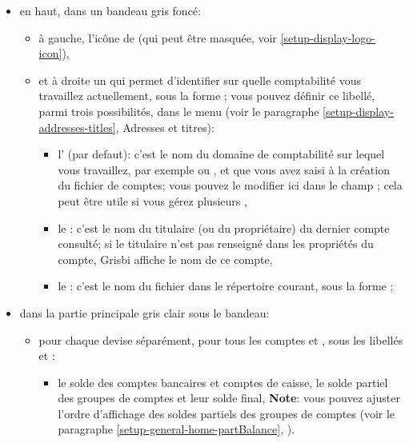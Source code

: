 \begin{itemize}
	\item en haut, dans un bandeau gris foncé:
		\begin{itemize}
	 		\item à gauche, l'icône de  (qui peut être masquée, voir \vref{setup-display-logo-icon}),
	 		\item et à droite un  qui permet d'identifier sur quelle comptabilité vous travaillez actuellement, sous la forme ; vous pouvez définir ce libellé, parmi trois possibilités, dans le menu  (voir le paragraphe \vref{setup-display-addresses-titles}, Adresses et titres):
				\begin{itemize}[label=-]
			 		\item l' (par defaut): c'est le nom du domaine de comptabilité sur lequel vous travaillez, par exemple  ou , et que vous avez saisi à la création du fichier de comptes; vous pouvez le modifier ici dans le champ ; cela peut être utile si vous gérez plusieurs , 
			 		\item le : c'est le nom du titulaire (ou du propriétaire) du dernier compte consulté; si le titulaire n'est pas renseigné dans les propriétés du compte, Grisbi affiche le nom de ce compte,
			 		\item le : c'est le nom du fichier dans le répertoire courant, sous la forme ;
				\end{itemize}
		\end{itemize}
	\item dans la partie principale gris clair sous le bandeau:
		\begin{itemize} 
			\item pour chaque devise séparément, pour tous les comptes et , sous les libellés  et :
				\begin{itemize}[label=-]
					\item le solde des comptes bancaires et comptes de caisse, le solde partiel des groupes de comptes et leur solde final,
			\newline
			\textbf{Note}: vous pouvez ajuster l'ordre d'affichage des soldes partiels des groupes de comptes (voir le paragraphe \vref{setup-general-home-partBalance}, ).			 

\end{itemize}
\end{itemize}
\end{itemize}
